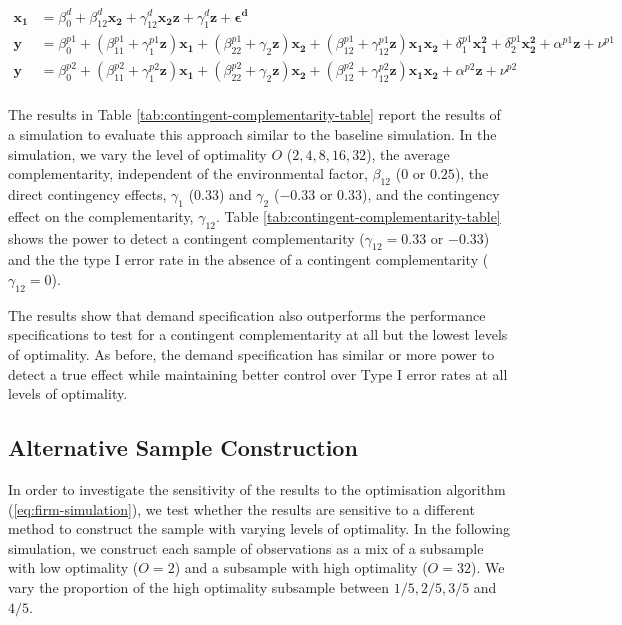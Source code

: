\documentclass[12pt]{article}
\begin{document}
\begin{align*} 
\mathbf{x_1} &= \beta_0^d + \beta_{12}^d \mathbf{x_2} + \gamma_{12}^d \mathbf{x_2 z}
        + \gamma_{1}^d \mathbf{z}
        + \mathbf{\epsilon^d} \\
\mathbf{y} &=  \beta^{p1}_0 + (\beta^{p1}_{11} + \gamma_1^{p1} \mathbf{z} )\mathbf{x_1} 
						+ (\beta_{22}^{p1} + \gamma_2 \mathbf{z} ) \mathbf{x_2} 
                        + (\beta_{12}^{p1} + \gamma_{12}^{p1} \mathbf{z}) \mathbf{x_1} \mathbf{x_2} 
                        + \delta_1^{p1} \mathbf{x^2_1} + \delta_2^{p1} \mathbf{x^2_2} 
                        + \alpha^{p1} \mathbf{z}
                        + \nu^{p1} \\
 \mathbf{y} &=  \beta^{p2}_0 + (\beta^{p2}_{11} + \gamma_1^{p2} \mathbf{z} )\mathbf{x_1} 
						+ (\beta_{22}^{p2} + \gamma_2 \mathbf{z} ) \mathbf{x_2} 
                        + (\beta_{12}^{p2} + \gamma_{12}^{p2} \mathbf{z}) \mathbf{x_1} \mathbf{x_2} 
                        + \alpha^{p2} \mathbf{z}
                        + \nu^{p2} \\
\end{align*}

The results in Table \ref{tab:contingent-complementarity-table} report the results of a simulation to evaluate this approach similar to the baseline simulation. In the simulation, we vary the level of optimality $O$ ($2, 4, 8, 16, 32$), the average complementarity, independent of the environmental factor, $\beta_{12}$ ($0$ or $0.25$), the direct contingency effects, $\gamma_1$ ($0.33$) and $\gamma_2$ ($-0.33$ or $0.33$), and the contingency effect on the complementarity, $\gamma_{12}$. Table \ref{tab:contingent-complementarity-table} shows the power to detect a contingent complementarity ($\gamma_{12} = 0.33$ or $-0.33$) and the the type I error rate in the absence of a contingent complementarity ($\gamma_{12} = 0$). 

The results show that demand specification also outperforms the performance specifications to test for a contingent complementarity at all but the lowest levels of optimality. As before, the demand specification has similar or more power to detect a true effect while maintaining better control over Type I error rates at all levels of optimality.

\subsection{Alternative Sample Construction}

In order to investigate the sensitivity of the results to the optimisation algorithm (\ref{eq:firm-simulation}), we test whether the results are sensitive to a different method to construct the sample with varying levels of optimality. In the following simulation, we construct each sample of observations as a mix of a subsample with low optimality ($O = 2$) and a subsample with high optimality ($O = 32$). We vary the proportion of the high optimality subsample between $1/5, 2/5, 3/5$ and $4/5$. 
\end{document}
